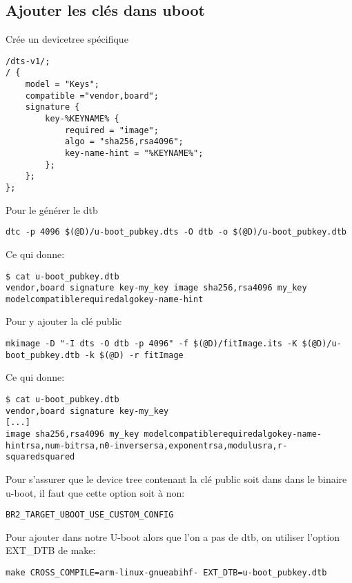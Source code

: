\documentclass[compress,aspectratio=169]{beamer}
\begin{document}
\subsection{Ajouter les clés dans uboot}
\begin{frame}[fragile]
Crée un devicetree spécifique
\begin{lstlisting}
/dts-v1/;
/ {
	model = "Keys";
	compatible ="vendor,board";
	signature {
		key-%KEYNAME% {
			required = "image";
			algo = "sha256,rsa4096";
			key-name-hint = "%KEYNAME%";
		};
	};
};
\end{lstlisting}
\end{frame}

\begin{frame}[fragile]
Pour le générer le dtb
\begin{lstlisting}[style=shell]
dtc -p 4096 $(@D)/u-boot_pubkey.dts -O dtb -o $(@D)/u-boot_pubkey.dtb
\end{lstlisting}
Ce qui donne:
\begin{lstlisting}[style=shell]
$ cat u-boot_pubkey.dtb
vendor,board signature key-my_key image sha256,rsa4096 my_key modelcompatiblerequiredalgokey-name-hint
\end{lstlisting}
\end{frame}

\begin{frame}[fragile]
Pour y ajouter la clé public
\begin{lstlisting}[style=shell]
mkimage -D "-I dts -O dtb -p 4096" -f $(@D)/fitImage.its -K $(@D)/u-boot_pubkey.dtb -k $(@D) -r fitImage
\end{lstlisting}
Ce qui donne:
\begin{lstlisting}[style=shell]
$ cat u-boot_pubkey.dtb
vendor,board signature key-my_key
[...]
image sha256,rsa4096 my_key modelcompatiblerequiredalgokey-name-hintrsa,num-bitrsa,n0-inversersa,exponentrsa,modulusra,r-squaredsquared
\end{lstlisting}     
\end{frame}

\begin{frame}[fragile]
Pour s'assurer que le device tree contenant la clé public soit dans dans le binaire u-boot, il faut que cette option soit à non:
\begin{lstlisting}[style=shell]
BR2_TARGET_UBOOT_USE_CUSTOM_CONFIG
\end{lstlisting}
Pour ajouter dans notre U-boot alors que l'on a pas de dtb, on utiliser l'option EXT\_DTB de make:
\begin{lstlisting}[style=shell]
make CROSS_COMPILE=arm-linux-gnueabihf- EXT_DTB=u-boot_pubkey.dtb
\end{lstlisting}
\end{frame}
\end{document}
